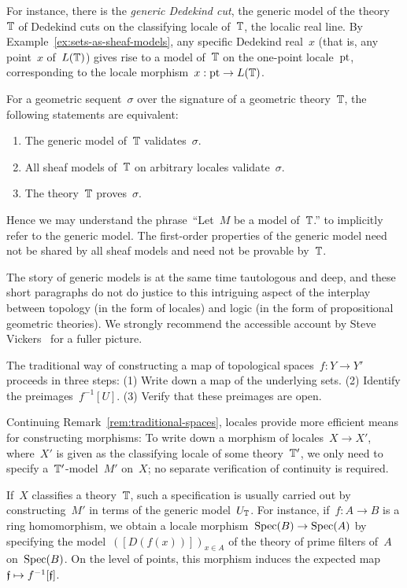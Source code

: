 \documentclass{ws-rv9x6}
\begin{document}
{For instance, there is the \emph{generic Dedekind cut}, the generic model of
the theory~$\mathbb{T}$ of Dedekind cuts on the classifying locale of~$\mathbb{T}$, the
localic real line. By Example~\ref{ex:sets-as-sheaf-models}, any specific Dedekind
real~$x$ (that is, any point~$x$ of~$L(\mathbb{T})$) gives rise to a model of~$\mathbb{T}$ on
the one-point locale~$\mathrm{pt}$, corresponding to the locale morphism~$x : \mathrm{pt} \to
L(\mathbb{T})$.

For a geometric sequent~$\sigma$ over the signature of a geometric
theory~$\mathbb{T}$, the following statements are equivalent:
\begin{enumerate}
\item The generic model of~$\mathbb{T}$ validates~$\sigma$.
\item All sheaf models of~$\mathbb{T}$ on arbitrary locales validate~$\sigma$.
\item The theory~$\mathbb{T}$ proves~$\sigma$.
\end{enumerate}
Hence we may understand the phrase~``Let~$M$ be a model of~$\mathbb{T}$.'' to
implicitly refer to the generic model. The first-order properties of the
generic model need not be shared by all sheaf models and need not be provable
by~$\mathbb{T}$.

The story of generic models is at the same time tautologous and deep, and these
short paragraphs do not do justice to this intriguing aspect of the interplay
between topology (in the form of locales) and logic (in the form of
propositional geometric theories). We strongly
recommend the accessible account by Steve Vickers~\cite{vickers:continuity} for a fuller
picture.

\begin{remark}The traditional way of constructing a map of topological spaces~$f : Y \to
Y'$ proceeds in three steps: (1) Write down a map of the underlying sets. (2)
Identify the preimages~$f^{-1}[U]$. (3) Verify that these preimages are open.

Continuing Remark~\ref{rem:traditional-spaces}, locales provide more
efficient means for constructing morphisms: To write down a morphism of
locales~$X \to X'$, where~$X'$ is given as the classifying locale of some
theory~$\mathbb{T}'$, we only need to specify a~$\mathbb{T}'$-model~$M'$ on~$X$; no separate
verification of continuity is required.

If~$X$ classifies a theory~$\mathbb{T}$, such a specification is usually carried out
by constructing~$M'$ in terms of the generic model~$U_{\mathbb{T}}$.
For instance, if~$f : A \to B$ is a ring homomorphism, we obtain a locale
morphism~$\mathrm{Spec}(B) \to \mathrm{Spec}(A)$ by specifying the model~$([D(f(x))])_{x \in
A}$ of the theory of prime filters of~$A$ on~$\mathrm{Spec}(B)$. On the level of
points, this morphism induces the expected map~$\mathfrak{f} \mapsto f^{-1}[\mathfrak{f}]$.
\end{remark}


}
\end{document}
